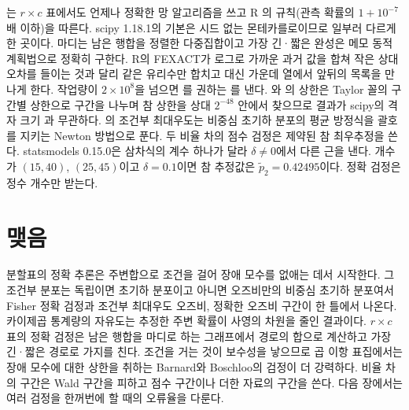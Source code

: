 \begin{instardust}
는 $r\times c$ 표에서도 언제나 정확한 망 알고리즘을 쓰고 R 의 규칙(관측 확률의 $1+10^{-7}$배 이하)을 따른다. scipy 1.18.1의 기본은 시드 없는 몬테카를로이므로 일부러 다르게 한 곳이다. 마디는 남은 행합을 정렬한 다중집합이고 가장 긴·짧은 완성은 메모 동적 계획법으로 정확히 구한다. R의 FEXACT가 로그로 가까운 과거 값을 합쳐 작은 상대오차를 들이는 것과 달리 같은 유리수만 합치고 대신 가운데 열에서 앞뒤의 목록을 만나게 한다. 작업량이 $2\times10^8$을 넘으면 를 권하는 를 낸다. 와 의 상한은 Taylor 꼴의 구간별 상한으로 구간을 나누며 참 상한을 상대 $2^{-48}$ 안에서 찾으므로 결과가 scipy의 격자 크기 과 무관하다. 의 조건부 최대우도는 비중심 초기하 분포의 평균 방정식을 괄호를 지키는 Newton 방법으로 푼다. 두 비율 차의 점수 검정은 제약된 참 최우추정을 쓴다. statsmodels 0.15.0은 삼차식의 계수 하나가 달라 $\delta\ne0$에서 다른 근을 낸다. 개수가 $(15,40)$, $(25,45)$이고 $\delta=0.1$이면 참 추정값은 $\tilde p_2=0.42495$이다. 정확 검정은 정수 개수만 받는다.
\end{instardust}

\section{맺음}

분할표의 정확 추론은 주변합으로 조건을 걸어 장애 모수를 없애는 데서 시작한다. 그 조건부 분포는 독립이면 초기하 분포이고 아니면 오즈비만의 비중심 초기하 분포여서 Fisher 정확 검정과 조건부 최대우도 오즈비, 정확한 오즈비 구간이 한 틀에서 나온다. 카이제곱 통계량의 자유도는 추정한 주변 확률이 사영의 차원을 줄인 결과이다. $r\times c$ 표의 정확 검정은 남은 행합을 마디로 하는 그래프에서 경로의 합으로 계산하고 가장 긴·짧은 경로로 가지를 친다. 조건을 거는 것이 보수성을 낳으므로 곱 이항 표집에서는 장애 모수에 대한 상한을 취하는 Barnard와 Boschloo의 검정이 더 강력하다. 비율 차의 구간은 Wald 구간을 피하고 점수 구간이나 더한 자료의 구간을 쓴다. 다음 장에서는 여러 검정을 한꺼번에 할 때의 오류율을 다룬다.

\chapterreferences
